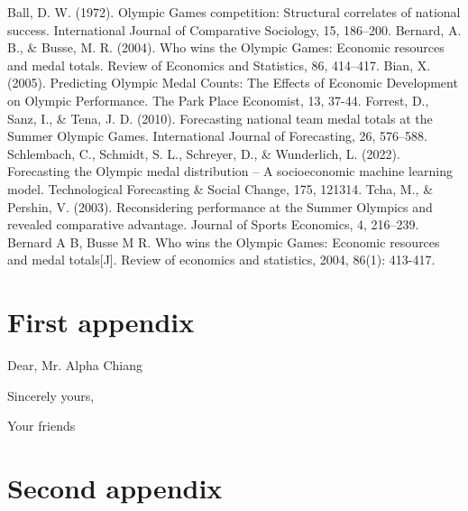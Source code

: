 \documentclass{mcmthesis}
\begin{document}
\begin{thebibliography}{99}
    
     Ball, D. W. (1972). Olympic Games competition: Structural correlates of national success. International Journal of Comparative Sociology, 15, 186–200.
     Bernard, A. B., \& Busse, M. R. (2004). Who wins the Olympic Games: Economic resources and medal totals. Review of Economics and Statistics, 86, 414–417.
     Bian, X. (2005). Predicting Olympic Medal Counts: The Effects of Economic Development on Olympic Performance. The Park Place Economist, 13, 37-44.
     Forrest, D., Sanz, I., \& Tena, J. D. (2010). Forecasting national team medal totals at the Summer Olympic Games. International Journal of Forecasting, 26, 576–588.
     Schlembach, C., Schmidt, S. L., Schreyer, D., \& Wunderlich, L. (2022). Forecasting the Olympic medal distribution – A socioeconomic machine learning model. Technological Forecasting \& Social Change, 175, 121314.
     Tcha, M., \& Pershin, V. (2003). Reconsidering performance at the Summer Olympics and revealed comparative advantage. Journal of Sports Economics, 4, 216–239.
     Bernard A B, Busse M R. Who wins the Olympic Games: Economic resources and medal totals[J]. Review of economics and statistics, 2004, 86(1): 413-417.

\end{thebibliography}

\begin{appendices}

\section{First appendix}


\begin{letter}{Dear, Mr. Alpha Chiang}

    \vspace{\parskip}

    Sincerely yours,

    Your friends

\end{letter}

\section{Second appendix}


\end{appendices}

\AImatter
\begin{ReportAiUse}{9}



\end{ReportAiUse}
\end{document}
